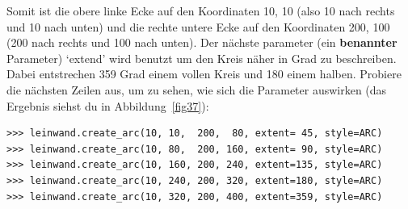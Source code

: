 Somit ist die obere linke Ecke auf den Koordinaten 10, 10 (also 10 nach rechts und 10 nach unten) und die rechte untere Ecke auf den Koordinaten 200, 100 (200 nach rechts und 100 nach unten). Der nächste parameter (ein \textbf{benannter} Parameter) `extend' wird benutzt um den Kreis näher in Grad zu beschreiben. Dabei entstrechen 359 Grad einem vollen Kreis und 180 einem halben. Probiere die nächsten Zeilen aus, um zu sehen, wie sich die Parameter auswirken (das Ergebnis siehst du in Abbildung~\ref{fig37}):

\begin{Verbatim}[frame=single]
>>> leinwand.create_arc(10, 10,  200,  80, extent= 45, style=ARC)
>>> leinwand.create_arc(10, 80,  200, 160, extent= 90, style=ARC)
>>> leinwand.create_arc(10, 160, 200, 240, extent=135, style=ARC)
>>> leinwand.create_arc(10, 240, 200, 320, extent=180, style=ARC)
>>> leinwand.create_arc(10, 320, 200, 400, extent=359, style=ARC)
\end{Verbatim}

